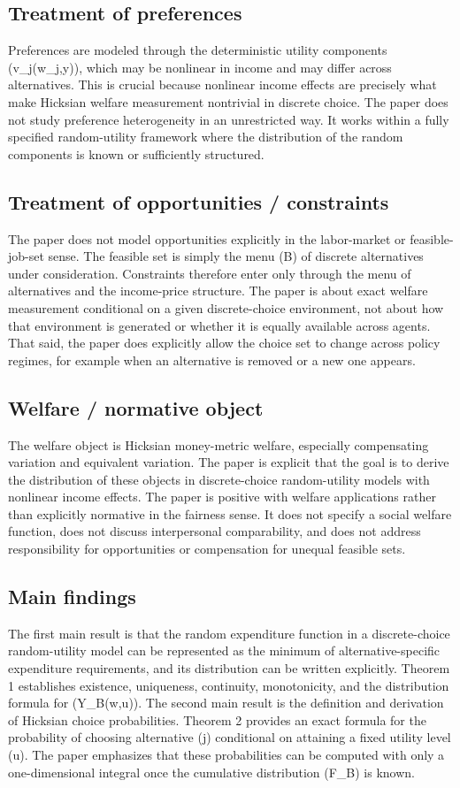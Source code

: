 \documentclass[11pt,a4paper]{article}
\begin{document}
\subsection*{Treatment of preferences}
Preferences are modeled through the deterministic utility components (v\_j(w\_j,y)), which may be nonlinear in income and may differ across alternatives. This is crucial because nonlinear income effects are precisely what make Hicksian welfare measurement nontrivial in discrete choice. The paper does not study preference heterogeneity in an unrestricted way. It works within a fully specified random-utility framework where the distribution of the random components is known or sufficiently structured.

\subsection*{Treatment of opportunities / constraints}
The paper does not model opportunities explicitly in the labor-market or feasible-job-set sense. The feasible set is simply the menu (B) of discrete alternatives under consideration. Constraints therefore enter only through the menu of alternatives and the income-price structure. The paper is about exact welfare measurement conditional on a given discrete-choice environment, not about how that environment is generated or whether it is equally available across agents. That said, the paper does explicitly allow the choice set to change across policy regimes, for example when an alternative is removed or a new one appears.

\subsection*{Welfare / normative object}
The welfare object is Hicksian money-metric welfare, especially compensating variation and equivalent variation. The paper is explicit that the goal is to derive the distribution of these objects in discrete-choice random-utility models with nonlinear income effects. The paper is positive with welfare applications rather than explicitly normative in the fairness sense. It does not specify a social welfare function, does not discuss interpersonal comparability, and does not address responsibility for opportunities or compensation for unequal feasible sets.

\subsection*{Main findings}
The first main result is that the random expenditure function in a discrete-choice random-utility model can be represented as the minimum of alternative-specific expenditure requirements, and its distribution can be written explicitly. Theorem 1 establishes existence, uniqueness, continuity, monotonicity, and the distribution formula for (Y\_B(w,u)). The second main result is the definition and derivation of Hicksian choice probabilities. Theorem 2 provides an exact formula for the probability of choosing alternative (j) conditional on attaining a fixed utility level (u). The paper emphasizes that these probabilities can be computed with only a one-dimensional integral once the cumulative distribution (F\_B) is known.
\end{document}
